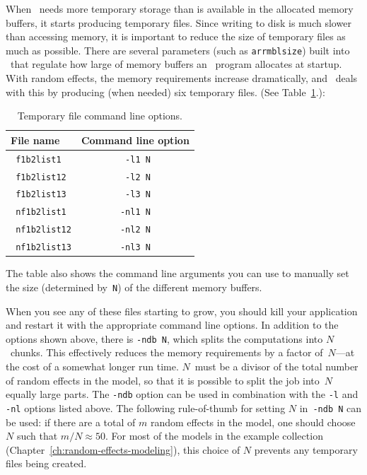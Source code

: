 \documentclass{admbmanual}
\begin{document}
When \scAB\ needs more temporary storage than is available in the
allocated memory buffers, it starts producing temporary files. Since writing to disk is much slower than
accessing memory, it is important to reduce the size of temporary files as much as possible. There are several
parameters (such as \texttt{arrmblsize}) built into \scAB\ that regulate how large of memory buffers an \scAB\ program
allocates at startup. With random effects, the memory requirements increase dramatically, and \scAR\ deals with
this by producing (when needed) six temporary files.  (See Table~\ref{tab:temporary-files}.):
\begin{table}[h]
\begin{center}
\begin{tabular}{@{\vrule height 12pt depth 6pt width0pt} l c }
\hline
\textbf{ File name} & \textbf{Command line option} \\ \hline
\texttt{ f1b2list1} & \texttt{ -l1 N} \\
\texttt{ f1b2list12} & \texttt{ -l2 N} \\
\texttt{ f1b2list13} & \texttt{ -l3 N} \\
\texttt{ nf1b2list1} & \texttt{-nl1 N} \\
\texttt{ nf1b2list12} & \texttt{-nl2 N} \\
\texttt{ nf1b2list13} & \texttt{-nl3 N} \\ \hline
\end{tabular}%
\end{center}
\caption{Temporary file command line options.}
\label{tab:temporary-files}
\end{table}
The table also shows the command line arguments you can use to manually set the size (determined by~\texttt{N}) of the different
memory buffers.

When you see any of these files starting to grow, you should kill your application and restart
it with the appropriate command line options. In addition to the options shown above,
there is \texttt{-ndb N}, which splits the computations into $N$~chunks. This effectively reduces
the memory requirements by a factor of~$N$---at the cost of a somewhat longer run time.
$N$~must be a divisor of the total number of random effects in the model,
so that it is possible to split the job into~$N$ equally large parts.
The \texttt{-ndb} option can be used in combination with the \texttt{-l} and \texttt{-nl} options listed above.
The following rule-of-thumb for setting $N$ in~\texttt{-ndb N} can be used: if there are a total of $m$ random effects in the model,
one should choose~$N$ such that $m/N\approx 50$.
For most of the models in the example collection (Chapter~\ref{ch:random-effects-modeling}),%
 this choice of $N$ prevents any temporary files being created.
\end{document}
